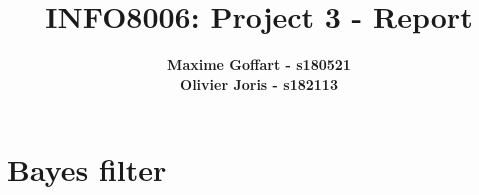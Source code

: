 \documentclass{article}
\begin{document}

\title{\Large{INFO8006: Project 3 - Report}}
\vspace{1cm}
\author{\small{\bf Maxime Goffart - s180521} \\ \small{\bf Olivier Joris - s182113}}

\maketitle


\section{Bayes filter}
\end{document}
